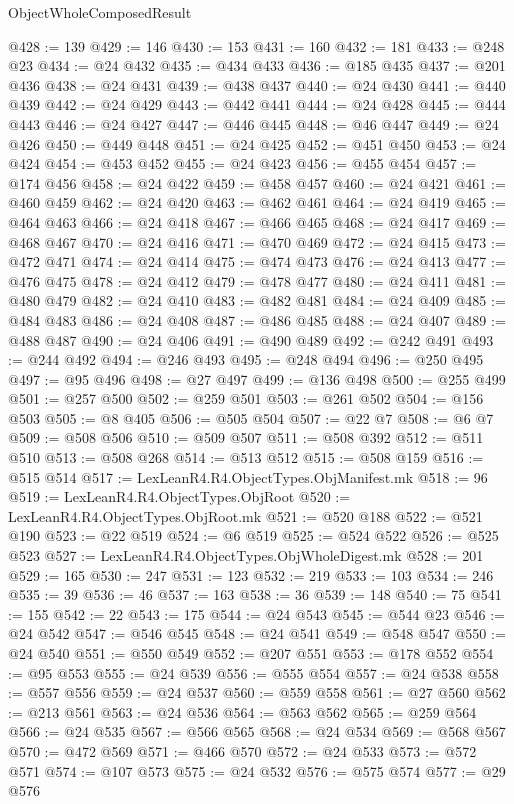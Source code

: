 \begin{lexlean}{ObjectWholeComposedResult}
\begin{coremodule}
@428 := 139
@429 := 146
@430 := 153
@431 := 160
@432 := 181
@433 := @248 @23
@434 := @24 @432
@435 := @434 @433
@436 := @185 @435
@437 := @201 @436
@438 := @24 @431
@439 := @438 @437
@440 := @24 @430
@441 := @440 @439
@442 := @24 @429
@443 := @442 @441
@444 := @24 @428
@445 := @444 @443
@446 := @24 @427
@447 := @446 @445
@448 := @46 @447
@449 := @24 @426
@450 := @449 @448
@451 := @24 @425
@452 := @451 @450
@453 := @24 @424
@454 := @453 @452
@455 := @24 @423
@456 := @455 @454
@457 := @174 @456
@458 := @24 @422
@459 := @458 @457
@460 := @24 @421
@461 := @460 @459
@462 := @24 @420
@463 := @462 @461
@464 := @24 @419
@465 := @464 @463
@466 := @24 @418
@467 := @466 @465
@468 := @24 @417
@469 := @468 @467
@470 := @24 @416
@471 := @470 @469
@472 := @24 @415
@473 := @472 @471
@474 := @24 @414
@475 := @474 @473
@476 := @24 @413
@477 := @476 @475
@478 := @24 @412
@479 := @478 @477
@480 := @24 @411
@481 := @480 @479
@482 := @24 @410
@483 := @482 @481
@484 := @24 @409
@485 := @484 @483
@486 := @24 @408
@487 := @486 @485
@488 := @24 @407
@489 := @488 @487
@490 := @24 @406
@491 := @490 @489
@492 := @242 @491
@493 := @244 @492
@494 := @246 @493
@495 := @248 @494
@496 := @250 @495
@497 := @95 @496
@498 := @27 @497
@499 := @136 @498
@500 := @255 @499
@501 := @257 @500
@502 := @259 @501
@503 := @261 @502
@504 := @156 @503
@505 := @8 @405
@506 := @505 @504
@507 := @22 @7
@508 := @6 @7
@509 := @508 @506
@510 := @509 @507
@511 := @508 @392
@512 := @511 @510
@513 := @508 @268
@514 := @513 @512
@515 := @508 @159
@516 := @515 @514
@517 := LexLeanR4.R4.ObjectTypes.ObjManifest.mk
@518 := 96
@519 := LexLeanR4.R4.ObjectTypes.ObjRoot
@520 := LexLeanR4.R4.ObjectTypes.ObjRoot.mk
@521 := @520 @188
@522 := @521 @190
@523 := @22 @519
@524 := @6 @519
@525 := @524 @522
@526 := @525 @523
@527 := LexLeanR4.R4.ObjectTypes.ObjWholeDigest.mk
@528 := 201
@529 := 165
@530 := 247
@531 := 123
@532 := 219
@533 := 103
@534 := 246
@535 := 39
@536 := 46
@537 := 163
@538 := 36
@539 := 148
@540 := 75
@541 := 155
@542 := 22
@543 := 175
@544 := @24 @543
@545 := @544 @23
@546 := @24 @542
@547 := @546 @545
@548 := @24 @541
@549 := @548 @547
@550 := @24 @540
@551 := @550 @549
@552 := @207 @551
@553 := @178 @552
@554 := @95 @553
@555 := @24 @539
@556 := @555 @554
@557 := @24 @538
@558 := @557 @556
@559 := @24 @537
@560 := @559 @558
@561 := @27 @560
@562 := @213 @561
@563 := @24 @536
@564 := @563 @562
@565 := @259 @564
@566 := @24 @535
@567 := @566 @565
@568 := @24 @534
@569 := @568 @567
@570 := @472 @569
@571 := @466 @570
@572 := @24 @533
@573 := @572 @571
@574 := @107 @573
@575 := @24 @532
@576 := @575 @574
@577 := @29 @576

\end{coremodule}
\end{lexlean}
